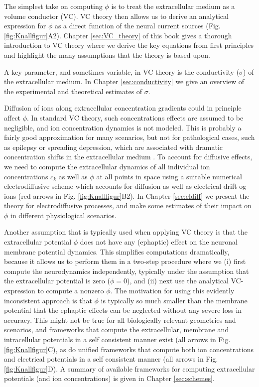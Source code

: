 The simplest take on computing $\phi$ is to treat the extracellular medium as a volume conductor (VC). VC theory then allows us to derive an analytical expression for $\phi$ as a direct function of the neural current sources (Fig. \ref{fig:Knallfigur}A2). Chapter \ref{sec:VC_theory} of this book gives a thorough introduction to VC theory where we derive the key equations from first principles and highlight the many assumptions that the theory is based upon.

A key parameter, and sometimes variable, in VC theory is the conductivity ($\sigma$) of the extracellular medium. In Chapter \ref{sec:conductivity} we give an overview of the experimental and theoretical estimates of $\sigma$. 

Diffusion of ions along extracellular concentration gradients could in principle affect $\phi$. In standard VC theory, such concentrations effects are assumed to be negligible, and ion concentration dynamics is not modeled. This is probably a fairly good approximation for many scenarios, but not for pathological cases, such as epilepsy or spreading depression, which are associated with dramatic concentration shifts in the extracellular medium \cite{Somjen2001, Frohlich2008, Zandt2015review, Ayata2015}. To account for diffusive effects, we need to compute the extracellular dynamics of all individual ion concentrations $c_k$ as well as $\phi$ at all points in space using a suitable numerical electrodiffusive scheme which accounts for diffusion as well as electrical drift og ions (red arrows in Fig. \ref{fig:Knallfigur}B2). In Chapter \ref{sec:eldiff} we present the theory for electrodiffusive processes, and make some estimates of their impact on $\phi$ in different physiological scenarios. 

Another assumption that is typically used when applying VC theory is that the extracellular potential $\phi$ does not have any (ephaptic) effect on the neuronal membrane potential dynamics. This simplifies computations dramatically, because it allows us to perform them in a two-step procedure where we (i) first compute the neurodynamics independently, typically under the assumption that the extracellular potential is zero ($\phi = 0$), and (ii) next use the analytical VC-expression to compute a nonzero $\phi$. The motivation for using this evidently inconsistent approach is that $\phi$ is typically so much smaller than the membrane potential that the ephaptic effects can be neglected without any severe loss in accuracy. This might not be true for all biologically relevant geometries and scenarios, and frameworks that compute the extracellular, membrane and intracellular potentials in a self consistent manner exist (all arrows in Fig. \ref{fig:Knallfigur}C), as do unified frameworks that compute both ion concentrations and electrical potentials in a self consistent manner (all arrows in Fig. \ref{fig:Knallfigur}D). A summary of available frameworks for computing extracellular potentials (and ion concentrations) is given in Chapter \ref{sec:schemes}.

